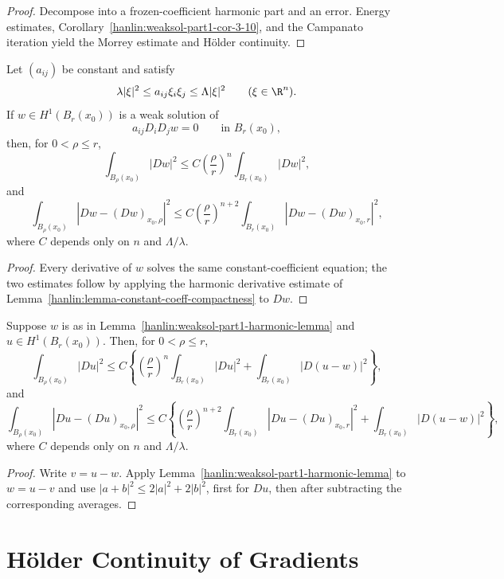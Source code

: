 \begin{proof}
\sketch Decompose into a frozen-coefficient harmonic part and an error.
Energy estimates, Corollary~\ref{hanlin:weaksol-part1-cor-3-10}, and the
Campanato iteration yield the Morrey estimate and H\"older continuity.
\end{proof}

\begin{lemma}\label{hanlin:weaksol-part1-harmonic-lemma}
Let $(a_{ij})$ be constant and satisfy
\[
\lambda|\xi|^2\leq a_{ij}\xi_i\xi_j\leq\Lambda|\xi|^2
\qquad(\xi\in\R^n).
\]
If $w\in H^1(B_r(x_0))$ is a weak solution of
\[
a_{ij}D_iD_jw=0\qquad\text{in }B_r(x_0),
\]
then, for $0<\rho\leq r$,
\[
\int_{B_\rho(x_0)}|Dw|^2
\leq C\left(\frac\rho r\right)^n\int_{B_r(x_0)}|Dw|^2,
\]
and
\[
\int_{B_\rho(x_0)}|Dw-(Dw)_{x_0,\rho}|^2
\leq C\left(\frac\rho r\right)^{n+2}
\int_{B_r(x_0)}|Dw-(Dw)_{x_0,r}|^2,
\]
where $C$ depends only on $n$ and $\Lambda/\lambda$.
\end{lemma}
\begin{proof}
\sketch Every derivative of $w$ solves the same constant-coefficient equation;
the two estimates follow by applying the harmonic derivative estimate of
Lemma~\ref{hanlin:lemma-constant-coeff-compactness} to $Dw$.
\end{proof}

\begin{corollary}\label{hanlin:weaksol-part1-cor-3-10}
Suppose $w$ is as in Lemma~\ref{hanlin:weaksol-part1-harmonic-lemma} and
$u\in H^1(B_r(x_0))$. Then, for
$0<\rho\leq r$,
\[
\int_{B_\rho(x_0)}|Du|^2
\leq C\left\{
\left(\frac\rho r\right)^n\int_{B_r(x_0)}|Du|^2
+\int_{B_r(x_0)}|D(u-w)|^2\right\},
\]
and
\[
\int_{B_\rho(x_0)}|Du-(Du)_{x_0,\rho}|^2
\leq C\left\{
\left(\frac\rho r\right)^{n+2}
\int_{B_r(x_0)}|Du-(Du)_{x_0,r}|^2
+\int_{B_r(x_0)}|D(u-w)|^2\right\},
\]
where $C$ depends only on $n$ and $\Lambda/\lambda$.
\end{corollary}
\begin{proof}
\sketch Write $v=u-w$. Apply
Lemma~\ref{hanlin:weaksol-part1-harmonic-lemma} to $w=u-v$ and use
$|a+b|^2\leq2|a|^2+2|b|^2$, first for $Du$, then after subtracting the
corresponding averages.
\end{proof}

\section{H\"older Continuity of Gradients}


